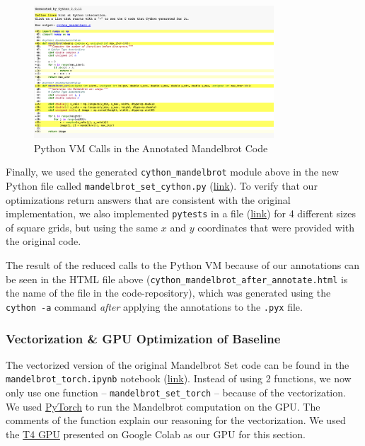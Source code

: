 \documentclass[a4paper,12pt]{article}
\begin{document}
\begin{figure}[H]
  \centering
  \includegraphics[width=0.8\textwidth]{images/after_annotate_mandelbrot.png}
  \caption{Python VM Calls in the Annotated Mandelbrot Code}
\end{figure}

Finally, we used the generated \verb|cython_mandelbrot| module above in the new Python file called \verb|mandelbrot_set_cython.py| (\href{https://github.com/paulmyr/DD2358-HPC25/blob/master/03_compgpu/bonus/mandelbrot_set_cython.py}{link}). To verify that our optimizations return answers that are consistent with the original implementation, we also implemented \verb|pytests| in a file (\href{https://github.com/paulmyr/DD2358-HPC25/blob/master/03_compgpu/bonus/mandelbrot_cython_default_test.py}{link}) for 4 different sizes of square grids, but using the same $x$ and $y$ coordinates that were provided with the original code. 

The result of the reduced calls to the Python VM because of our annotations can be seen in the HTML file above (\verb|cython_mandelbrot_after_annotate.html| is the name of the file in the code-repository), which was generated using the \verb|cython -a| command \textit{after} applying the annotations to the \verb|.pyx| file.

\subsubsection{Vectorization \& GPU Optimization of Baseline}
The vectorized version of the original Mandelbrot Set code can be found in the \verb|mandelbrot_torch.ipynb| notebook (\href{https://github.com/paulmyr/DD2358-HPC25/blob/master/03_compgpu/bonus/mandelbrot_torch.ipynb}{link}). Instead of using 2 functions, we now only use one function -- \verb|mandelbrot_set_torch| -- because of the vectorization. We used \underline{PyTorch} to run the Mandelbrot computation on the GPU. The comments of the function explain our reasoning for the vectorization. We used the \underline{T4 GPU} presented on Google Colab as our GPU for this section.
\end{document}

